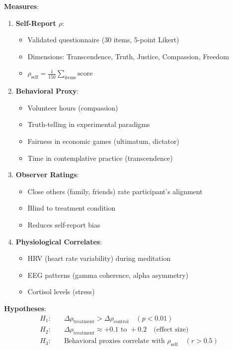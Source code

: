 \documentclass[11pt,a4paper]{article}
\theoremstyle{definition}
\theoremstyle{remark}
\begin{document}
\begin{small}
\begin{enumerate}
\begin{protocol}
\textbf{Measures}:
\begin{enumerate}
    \item \textbf{Self-Report \(\rho\)}:
        \begin{itemize}
            \item Validated questionnaire (30 items, 5-point Likert)
            \item Dimensions: Transcendence, Truth, Justice, Compassion, Freedom
            \item \(\rho_{\text{self}} = \frac{1}{150}\sum_{\text{items}} \text{score}\)
        \end{itemize}
    
    \item \textbf{Behavioral Proxy}:
        \begin{itemize}
            \item Volunteer hours (compassion)
            \item Truth-telling in experimental paradigms
            \item Fairness in economic games (ultimatum, dictator)
            \item Time in contemplative practice (transcendence)
        \end{itemize}
    
    \item \textbf{Observer Ratings}:
        \begin{itemize}
            \item Close others (family, friends) rate participant's alignment
            \item Blind to treatment condition
            \item Reduces self-report bias
        \end{itemize}
    
    \item \textbf{Physiological Correlates}:
        \begin{itemize}
            \item HRV (heart rate variability) during meditation
            \item EEG patterns (gamma coherence, alpha asymmetry)
            \item Cortisol levels (stress)
        \end{itemize}
\end{enumerate}

\textbf{Hypotheses}:
\begin{align}
H_1: \quad &\Delta\rho_{\text{treatment}} > \Delta\rho_{\text{control}} \quad (p < 0.01) \\
H_2: \quad &\Delta\rho_{\text{treatment}} \approx +0.1 \text{ to } +0.2 \quad \text{(effect size)} \\
H_3: \quad &\text{Behavioral proxies correlate with } \rho_{\text{self}} \quad (r > 0.5)
\end{align}


\end{protocol}
\end{enumerate}
\end{small}
\end{document}
